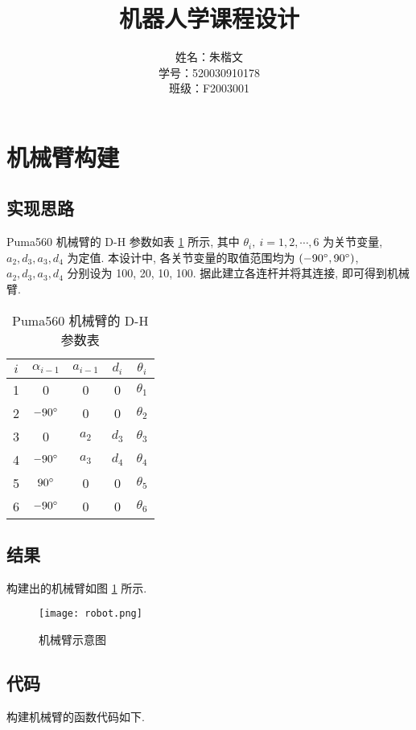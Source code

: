 \documentclass{article}
\title{机器人学课程设计}
\author{姓名：朱楷文\\ 学号：520030910178\\ 班级：F2003001 }
\date{}
\begin{document}
\maketitle

\section{机械臂构建}
\subsection{实现思路}
Puma560 机械臂的 D-H 参数如表 \ref{DH} 所示, 其中 $\theta_i,\  i=1,2,\cdots,6$ 为关节变量, $a_2, d_3, a_3, d_4$ 为定值. 本设计中, 各关节变量的取值范围均为 $(-90\degree, 90\degree)$, $a_2, d_3, a_3, d_4$ 分别设为 100, 20, 10, 100. 据此建立各连杆并将其连接, 即可得到机械臂.
\begin{table}[H]
    \centering
    \caption{Puma560 机械臂的 D-H 参数表}
    \label{DH}
    \begin{tabular}{ccccc}
    \toprule
    $i$ & $\alpha_{i-1}$ & $a_{i-1}$ & $d_i$ & $\theta_i$  \\
    \midrule
    1   &  0 & 0 & 0 & $\theta_1$ \\
    2   &  $-90\degree$ & 0 & 0 & $\theta_2$ \\
    3   &  0 & $a_2$ & $d_3$ & $\theta_3$ \\
    4   &  $-90\degree$ & $a_3$ & $d_4$ & $\theta_4$ \\
    5   &  $90\degree$ & 0 & 0 & $\theta_5$ \\
    6   &  $-90\degree$ & 0 & 0 & $\theta_6$ \\
    \bottomrule
    \end{tabular}
\end{table}

\subsection{结果}
构建出的机械臂如图 \ref{robot} 所示.
\begin{figure}[H]
    \centering
    \texttt{[image: robot.png]}
    \caption{机械臂示意图}
    \label{robot}
\end{figure}

\subsection{代码}
构建机械臂的函数代码如下.
\medskip

\end{document}
